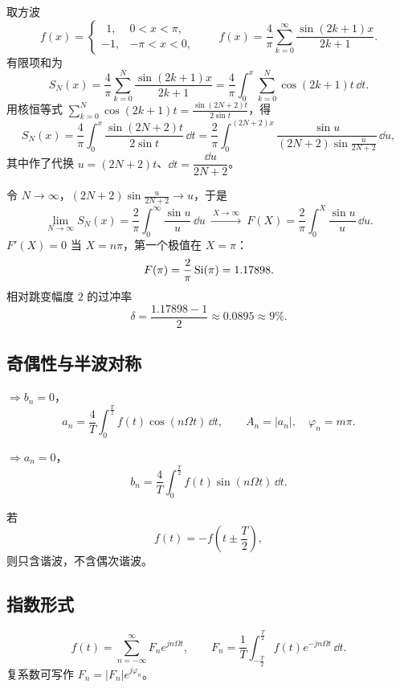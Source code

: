 \begin{note}

取方波
\[
    f(x)=
    \begin{cases}
        \ \ 1, & 0<x<\pi,\\
        -1, & -\pi<x<0,
    \end{cases}
    \qquad
    f(x)=\frac{4}{\pi}\sum_{k=0}^{\infty}\frac{\sin(2k+1)x}{2k+1}.
\]
有限项和为
\[
    S_N(x)=\frac{4}{\pi}\sum_{k=0}^{N}\frac{\sin(2k+1)x}{2k+1}
    =\frac{4}{\pi}\int_0^{x}\sum_{k=0}^{N}\cos(2k+1)t\,\dd t .
\]
用核恒等式 $\displaystyle\sum_{k=0}^{N}\cos(2k+1)t=\frac{\sin(2N+2)t}{2\sin t}$，得
\[
    S_N(x)=\frac{4}{\pi}\int_0^{x}\frac{\sin(2N+2)t}{2\sin t}\,\dd t
    =\frac{2}{\pi}\int_0^{(2N+2)x}
    \frac{\sin u}{(2N+2)\sin\frac{u}{2N+2}}\,\dd u,
\]
其中作了代换 $u=(2N+2)t$、$\dd t=\dfrac{\dd u}{2N+2}$。

令 $N\to\infty$，$(2N+2)\sin\frac{u}{2N+2}\to u$，于是
\[
    \lim_{N\to\infty}S_N(x)=\frac{2}{\pi}\int_0^{\infty}\frac{\sin u}{u}\,\dd u
    \ \xrightarrow{\ X\to\infty\ }\
    F(X)=\frac{2}{\pi}\int_0^{X}\frac{\sin u}{u}\,\dd u .
\]
$F'(X)=0$ 当 $X=n\pi$，第一个极值在 $X=\pi$：
\[
    F(\pi)=\frac{2}{\pi}\operatorname{Si}(\pi)=1.17898 .
\]
相对跳变幅度 $2$ 的过冲率
\[
    \delta=\frac{1.17898-1}{2}\approx 0.0895\approx 9\% .
\]
\end{note}

\subsection{奇偶性与半波对称}

 $\Rightarrow b_n=0$，
\[
    a_n=\frac{4}{T}\int_0^{\frac{T}{2}}f(t)\cos(n\Omega t)\,\dd t,\qquad
    A_n=|a_n|,\quad \varphi_n=m\pi .
\]

 $\Rightarrow a_n=0$，
\[
    b_n=\frac{4}{T}\int_0^{\frac{T}{2}}f(t)\sin(n\Omega t)\,\dd t .
\]

\quad 若
\[
    f(t)=-f\!\left(t\pm\frac{T}{2}\right),
\]
则只含谐波，不含偶次谐波。

\subsection{指数形式}

\begin{equation}
    f(t)=\sum_{n=-\infty}^{\infty}F_n e^{jn\Omega t},
    \qquad
    F_n=\frac{1}{T}\int_{-\frac{T}{2}}^{\frac{T}{2}}f(t)e^{-jn\Omega t}\,\dd t .
\end{equation}
复系数可写作 $F_n=|F_n|e^{j\varphi_n}$。


